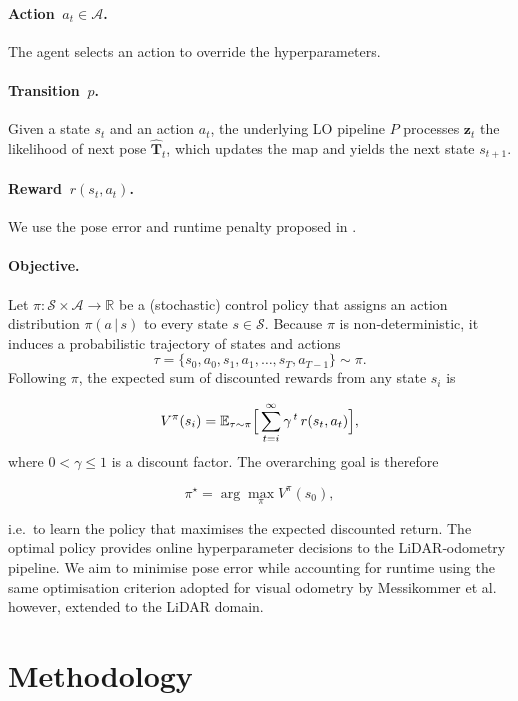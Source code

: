 \documentclass[12pt]{article}
\begin{document}
\paragraph{Action\, $a_t\!\in\!\mathcal{A}$.}
The agent selects an action to override the hyperparameters.

\paragraph{Transition\, $p$.}
Given a state $s_t$ and an action $a_t$, the underlying LO pipeline $P$ processes $\mathbf{z}_t$ the likelihood of next pose $\hat{\mathbf{T}}_t$, which updates the map and yields the next state $s_{t+1}$.

\paragraph{Reward\, $r(s_t,a_t)$.}
We use the pose error and runtime penalty proposed in \cite{nicomessikommer_2024_reinforcement}.

\paragraph{Objective.}
Let $\pi:\mathcal{S}\!\times\!\mathcal{A}\!\rightarrow\!\mathbb{R}$ be a (stochastic) control policy that assigns
an action distribution $\pi(a\,|\,s)$ to every state $s\!\in\!\mathcal{S}$.  
Because $\pi$ is non‑deterministic, it induces a probabilistic trajectory of states and actions
\[
  \tau=\{s_0,a_0,s_1,a_1,\dots,s_T,a_{T-1}\}\sim\pi .
\]
Following $\pi$, the expected sum of discounted rewards from any state $s_i$ is

\[
  V^{\pi}(s_i)=
  \mathbb{E}_{\tau\sim\pi}
  \Bigl[\,
      \sum_{t=i}^{\infty}\gamma^{\,t}\,r(s_t,a_t)
  \Bigr],
\]
where $0<\gamma\le 1$ is a discount factor.  
The overarching goal is therefore

\[
  \pi^{\star}=\arg\max_{\pi} V^{\pi}(s_0),
\]

i.e.\ to learn the policy that maximises the expected discounted return. The optimal policy provides online hyperparameter decisions to the LiDAR‑odometry pipeline. We aim to minimise pose error while accounting for runtime using the same optimisation criterion adopted for visual odometry by Messikommer et al. however, extended to the LiDAR domain.


\section{Methodology}
\end{document}
